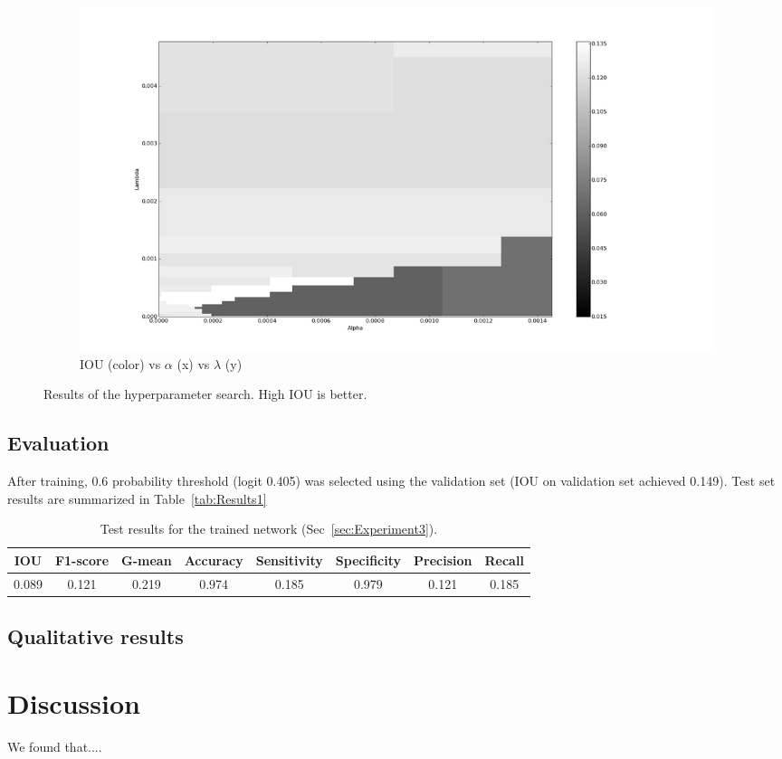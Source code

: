 \begin{figure}[h]
	\begin{subfigure}{0.32\textwidth}
		\centering
                \includegraphics[width=\textwidth]{plots/hs5_pcolor.png}
         \caption{IOU (color) vs $\alpha$ (x) vs $\lambda$ (y)}
	\end{subfigure}
	\caption[Hyperparameter search for Experiment 3]{Results of the hyperparameter search. High IOU is better.}
	 \label{fig:Hs5}
\end{figure}

\subsection{Evaluation}
After training, 0.6 probability threshold (logit 0.405) was selected using the validation set (IOU on validation set achieved 0.149). Test set results are summarized in Table~\ref{tab:Results1}
\begin{table}[h]
	\centering
	\begin{tabular}{cccccccc}
	\hline
	\textbf{IOU}	& \textbf{F1-score}	& \textbf{G-mean} &\textbf{Accuracy}	& \textbf{Sensitivity} & \textbf{Specificity} & \textbf{Precision} & \textbf{Recall}\\
	\hline
	0.089 & 0.121 & 0.219 & 0.974 & 0.185 & 0.979 & 0.121 & 0.185\\
	\hline
	\end{tabular}
	\caption[Results for Experiment 3]{Test results for the trained network (Sec~\ref{sec:Experiment3}).}
	\label{tab:Results3}
\end{table}

\subsection{Qualitative results}



\section{Discussion}
We found that....

